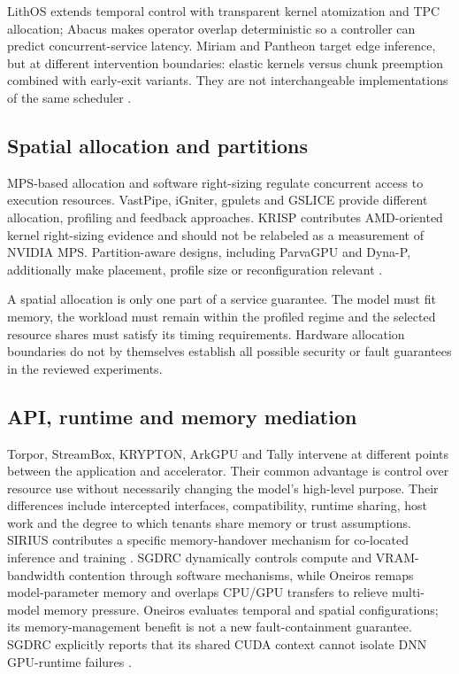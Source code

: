 LithOS extends temporal control with transparent kernel atomization and TPC allocation; Abacus makes operator overlap deterministic so a controller can predict concurrent-service latency. Miriam and Pantheon target edge inference, but at different intervention boundaries: elastic kernels versus chunk preemption combined with early-exit variants. They are not interchangeable implementations of the same scheduler \cite{s021,s022,s023,s025}.

\subsection{Spatial allocation and partitions}
MPS-based allocation and software right-sizing regulate concurrent access to execution resources. VastPipe, iGniter, gpulets and GSLICE provide different allocation, profiling and feedback approaches. KRISP contributes AMD-oriented kernel right-sizing evidence and should not be relabeled as a measurement of NVIDIA MPS. Partition-aware designs, including ParvaGPU and Dyna-P, additionally make placement, profile size or reconfiguration relevant \cite{P001,P002,P003,P008,P011,P020,P021}.

A spatial allocation is only one part of a service guarantee. The model must fit memory, the workload must remain within the profiled regime and the selected resource shares must satisfy its timing requirements. Hardware allocation boundaries do not by themselves establish all possible security or fault guarantees in the reviewed experiments.

\subsection{API, runtime and memory mediation}
Torpor, StreamBox, KRYPTON, ArkGPU and Tally intervene at different points between the application and accelerator. Their common advantage is control over resource use without necessarily changing the model's high-level purpose. Their differences include intercepted interfaces, compatibility, runtime sharing, host work and the degree to which tenants share memory or trust assumptions. SIRIUS contributes a specific memory-handover mechanism for co-located inference and training \cite{P010,P012,P013,P014,P019,P022}.
SGDRC dynamically controls compute and VRAM-bandwidth contention through software mechanisms, while Oneiros remaps model-parameter memory and overlaps CPU/GPU transfers to relieve multi-model memory pressure. Oneiros evaluates temporal and spatial configurations; its memory-management benefit is not a new fault-containment guarantee. SGDRC explicitly reports that its shared CUDA context cannot isolate DNN GPU-runtime failures \cite{s024,s026}.

